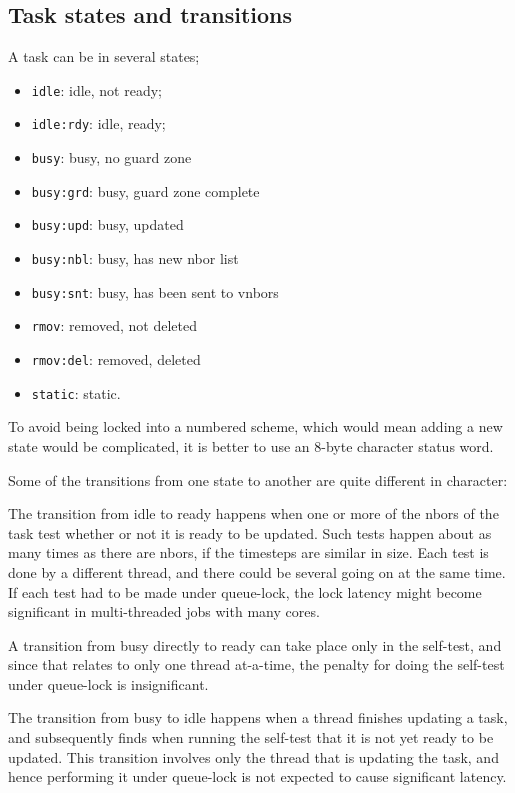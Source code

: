 \documentclass[paper=a4,fontsize=11pt]{scrartcl}
\numberwithin{equation}{section}		%
\numberwithin{figure}{section}			%
\numberwithin{table}{section}				%
\newcommand{\codecolor}{\color{Blue}}
\newcommand{\Code}[1]{{\codecolor\texttt{#1}}}
\begin{document}
\subsection{Task states and transitions}
A task can be in several states; 
\begin{itemize}
    \item \Code{idle}: idle, not ready;
    \item \Code{idle:rdy}: idle, ready;
    \item \Code{busy}: busy, no guard zone
    \item \Code{busy:grd}: busy, guard zone complete
    \item \Code{busy:upd}: busy, updated
    \item \Code{busy:nbl}: busy, has new nbor list
    \item \Code{busy:snt}: busy, has been sent to vnbors
    \item \Code{rmov}: removed, not deleted
    \item \Code{rmov:del}: removed, deleted
    \item \Code{static}: static. 
 \end{itemize}
To avoid being locked into a numbered scheme, which would mean adding a new state would be complicated, it is better to use an 8-byte character status word.
 
Some of the transitions from one state to another are quite different in character:

The transition from idle to ready happens when one or more of the nbors of the task test whether or not it is ready to be updated.  Such tests happen about as many times as there are nbors, if the timesteps are similar in size.  Each test is done by a different thread, and there could be several going on at the same time.  If each test had to be made under queue-lock, the lock latency might become significant in multi-threaded jobs with many cores.

A transition from busy directly to ready can take place only in the self-test, and since that relates to only one thread at-a-time, the penalty for doing the self-test under queue-lock is insignificant.

The transition from busy to idle happens when a thread finishes updating a task, and subsequently finds when running the self-test that it is not yet ready to be updated.  This transition involves only the thread that is updating the task, and hence performing it under queue-lock is not expected to cause significant latency.
\end{document}
